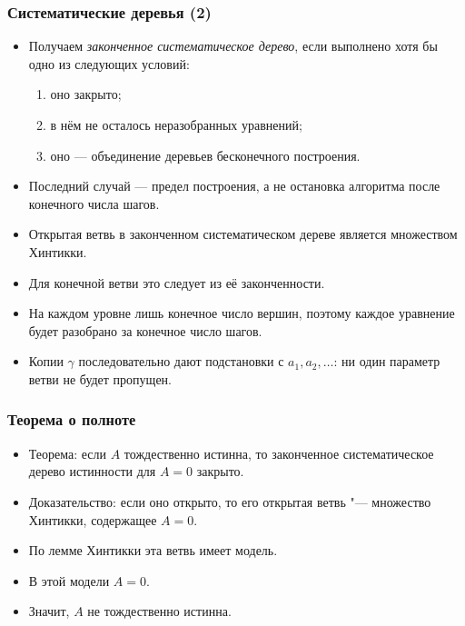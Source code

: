 \documentclass[10pt]{beamer}
\begin{document}
\begin{frame}
\begin{framefont}{\small}
    \frametitle{Систематические деревья (2)}
    \begin{itemize}
        \item Получаем \emph{законченное систематическое дерево}, если выполнено хотя бы одно из следующих условий:
        \begin{enumerate}
            \item оно закрыто;
            \item в нём не осталось неразобранных уравнений;
            \item оно --- объединение деревьев бесконечного построения.
        \end{enumerate}
        \item Последний случай --- предел построения, а не остановка алгоритма после конечного числа шагов.
        \pause
        \item Открытая ветвь в законченном систематическом дереве является множеством Хинтикки.
        \item Для конечной ветви это следует из её законченности.
        \item На каждом уровне лишь конечное число вершин, поэтому каждое уравнение будет разобрано за конечное число шагов.
        \item Копии $\gamma$ последовательно дают подстановки с $a_1,a_2,\ldots$: ни один параметр ветви не будет пропущен.
    \end{itemize}
\end{framefont}
\end{frame}

\begin{frame}
    \frametitle{Теорема о полноте}
    \begin{itemize}
        \item Теорема: если $A$ тождественно истинна, то законченное систематическое дерево истинности для $A=0$ закрыто.
        \pause
        \item Доказательство: если оно открыто, то его открытая ветвь "--- множество Хинтикки, содержащее $A=0$. 
        \item По лемме Хинтикки эта ветвь имеет модель.
        \item В этой модели $A=0$.
        \item Значит, $A$ не тождественно истинна.
    \end{itemize}
\end{frame}
\end{document}
